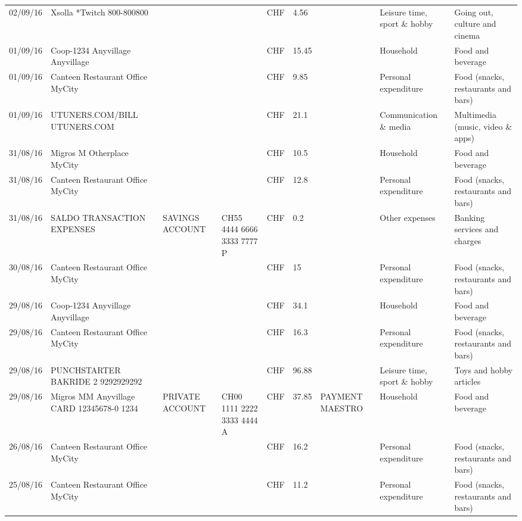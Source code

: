 \begin{landscape}
\begin{adjustwidth}{-2cm}{-2cm}
\begin{tiny}
\begin{longtable}{lp{4cm}llllp{3cm}ll}
		02/09/16 & Xsolla *Twitch           800-800800 &       &       & CHF   & 4.56  &       & Leisure time, sport \& hobby & Going out, culture and cinema \\
		01/09/16 & Coop-1234 Anyvillage    Anyvillage &       &       & CHF   & 15.45 &       & Household & Food and beverage \\
		01/09/16 & Canteen Restaurant Office      MyCity &       &       & CHF   & 9.85  &       & Personal expenditure & Food (snacks, restaurants and bars) \\
		01/09/16 & UTUNERS.COM/BILL          UTUNERS.COM &       &       & CHF   & 21.1  &       & Communication \& media & Multimedia (music, video \& apps) \\
		31/08/16 & Migros M Otherplace   MyCity &       &       & CHF   & 10.5  &       & Household & Food and beverage \\
		31/08/16 & Canteen Restaurant Office      MyCity &       &       & CHF   & 12.8  &       & Personal expenditure & Food (snacks, restaurants and bars) \\
		31/08/16 & SALDO TRANSACTION EXPENSES & SAVINGS ACCOUNT & CH55 4444 6666 3333 7777 P & CHF   & 0.2   &       & Other expenses & Banking services and charges \\
		30/08/16 & Canteen Restaurant Office      MyCity &       &       & CHF   & 15    &       & Personal expenditure & Food (snacks, restaurants and bars) \\
		29/08/16 & Coop-1234 Anyvillage    Anyvillage &       &       & CHF   & 34.1  &       & Household & Food and beverage \\
		29/08/16 & Canteen Restaurant Office      MyCity &       &       & CHF   & 16.3  &       & Personal expenditure & Food (snacks, restaurants and bars) \\
		29/08/16 & PUNCHSTARTER BAKRIDE 2   9292929292 &       &       & CHF   & 96.88 &       & Leisure time, sport \& hobby & Toys and hobby articles \\
		29/08/16 & Migros MM Anyvillage CARD 12345678-0 1234 & PRIVATE ACCOUNT & CH00 1111 2222 3333 4444 A & CHF   & 37.85 & PAYMENT MAESTRO & Household & Food and beverage \\
		26/08/16 & Canteen Restaurant Office      MyCity &       &       & CHF   & 16.2  &       & Personal expenditure & Food (snacks, restaurants and bars) \\
		25/08/16 & Canteen Restaurant Office      MyCity &       &       & CHF   & 11.2  &       & Personal expenditure & Food (snacks, restaurants and bars) \\

\end{longtable}
\end{tiny}
\end{adjustwidth}
\end{landscape}
